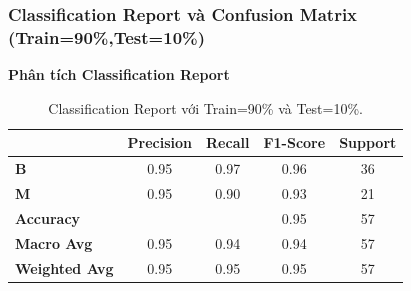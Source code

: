 \subsubsection{Classification Report và Confusion Matrix (Train=90\%,Test=10\%)}

\textbf{Phân tích Classification Report}
\begin{table}[h!]
	\centering
	\begin{tabular}{|l|c|c|c|c|}
		\hline
		\textbf{} & \textbf{Precision} & \textbf{Recall} & \textbf{F1-Score} & \textbf{Support} \\ \hline
		\textbf{B} & 0.95 & 0.97 & 0.96 & 36 \\ \hline
		\textbf{M} & 0.95 & 0.90 & 0.93 & 21 \\ \hline
		\textbf{Accuracy} & \multicolumn{2}{c|}{} & 0.95 & 57 \\ \hline
		\textbf{Macro Avg} & 0.95 & 0.94 & 0.94 & 57 \\ \hline
		\textbf{Weighted Avg} & 0.95 & 0.95 & 0.95 & 57 \\ \hline
	\end{tabular}
	\caption{Classification Report với Train=90\% và Test=10\%.}
\end{table}

